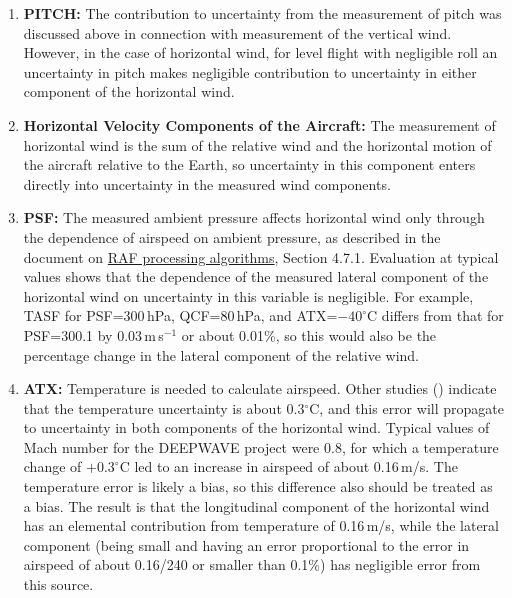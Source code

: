 \documentclass[12pt,twoside,english]{article}\usepackage[]{graphicx}\usepackage[]{color}
\let\OrgIndex\index
\renewcommand*{\index}[1]{\OrgIndex{#1}}
\begin{document}
{{\begin{enumerate}
\item \textbf{PITCH:}
The contribution to uncertainty from the measurement of pitch was discussed above in connection with measurement of the vertical wind. However, in the case of horizontal wind, for level flight with negligible roll an uncertainty in pitch makes negligible contribution to uncertainty in either component of the horizontal wind.  
\item \textbf{Horizontal Velocity Components of the Aircraft:} 
The measurement of horizontal wind is the sum of the relative wind and the horizontal motion of the aircraft relative to the Earth, so uncertainty in this component enters directly into uncertainty in the measured wind components.  
\item \textbf{PSF:} 
The measured ambient pressure affects horizontal wind only through the dependence of airspeed on ambient pressure, as described in the document on \href{https://drive.google.com/file/d/0B1kIUH45ca5ATFV5d3QyQ0JpSjA/view?usp=sharing}{RAF processing algorithms}, Section 4.7.1. Evaluation at typical values shows that the dependence of the measured lateral component of the horizontal wind on uncertainty in this variable is negligible. For example, TASF for PSF=300\,hPa, QCF=80\,hPa, and ATX=$-40^{\circ}$C differs from that for PSF=300.1 by 0.03\,m\,s$^{-1}$ or about 0.01\%, so this would also be the percentage change in the lateral component of the relative wind.  
\item \textbf{ATX:} 
Temperature is needed to calculate airspeed. Other studies (\citet{CooperEtAl2014}) indicate that the temperature uncertainty is about 0.3$^{\circ}$C, and this error will propagate to uncertainty in both components of the horizontal wind. Typical values of Mach number for the DEEPWAVE project were 0.8, for which a temperature change of $+0.3^{\circ}$C led to an increase in airspeed of about 0.16\,m/s. The temperature error is likely a bias, so this difference also should be treated as a bias. The result is that the longitudinal component of the horizontal wind has an elemental contribution from temperature of 0.16\,m/s, while the lateral component (being small and having an error proportional to the error in airspeed of about 0.16/240 or smaller than 0.1\%) has negligible error from this source.  

\end{enumerate}}}
\end{document}
